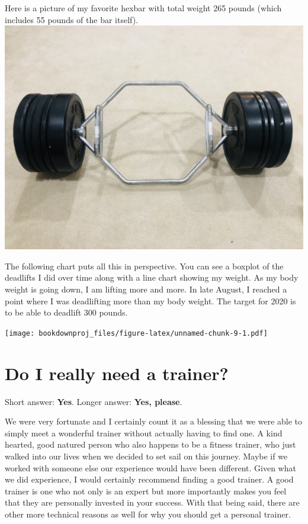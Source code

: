 \documentclass[
  oneside]{book}
\begin{document}
Here is a picture of my favorite hexbar with total weight 265 pounds (which includes 55 pounds of the bar itself).\\
\includegraphics{pictures/hexbar-w-255p.jpg}

The following chart puts all this in perspective. You can see a boxplot of the deadlifts I did over time along with a line chart showing my weight. As my body weight is going down, I am lifting more and more. In late August, I reached a point where I was deadlifting more than my body weight. The target for 2020 is to be able to deadlift 300 pounds.

\texttt{[image: bookdownproj\_files/figure-latex/unnamed-chunk-9-1.pdf]}

\hypertarget{do-i-really-need-a-trainer}{%
\section{Do I really need a trainer?}\label{do-i-really-need-a-trainer}}

Short answer: \textbf{Yes}. Longer answer: \textbf{Yes, please}.

We were very fortunate and I certainly count it as a blessing that we were able to simply meet a wonderful trainer without actually having to find one. A kind hearted, good natured person who also happens to be a fitness trainer, who just walked into our lives when we decided to set sail on this journey. Maybe if we worked with someone else our experience would have been different. Given what we did experience, I would certainly recommend finding a good trainer. A good trainer is one who not only is an expert but more importantly makes you feel that they are personally invested in your success. With that being said, there are other more technical reasons as well for why you should get a personal trainer.
\end{document}
